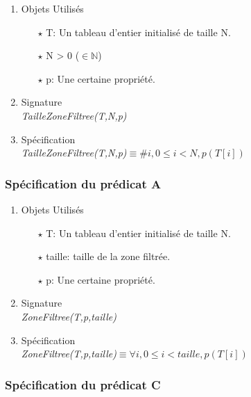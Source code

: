 \documentclass[a4paper, 11pt, oneside]{article}
\begin{document}
        \begin{enumerate}
            \item Objets Utilisés
                \begin{itemize}
                    \item[$\star$] T: Un tableau d'entier initialisé de taille N.
                    \item[$\star$] N > 0 ($\in \mathbb{N}$)
                    \item[$\star$] p: Une certaine propriété. 
                \end{itemize}

            \item Signature \\
                \textit{TailleZoneFiltree(T,N,p)}

            \item Spécification\\
                \textit{TailleZoneFiltree(T,N,p)}$\equiv \# i, 0\leq i < N, p(T[i])$
        \end{enumerate}

        \subsubsection{Spécification du prédicat A}

        \begin{enumerate}
            \item Objets Utilisés
                \begin{itemize}
                    \item[$\star$] T: Un tableau d'entier initialisé de taille N.
                    \item[$\star$] taille: taille de la zone filtrée.
                    \item[$\star$] p: Une certaine propriété. 
                \end{itemize}

            \item Signature \\
                \textit{ZoneFiltree(T,p,taille)}

            \item Spécification\\
                \textit{ZoneFiltree(T,p,taille)}$\equiv \forall i, 0\leq i < taille, p(T[i])$
        \end{enumerate}

        \subsubsection{Spécification du prédicat C}
\end{document}
